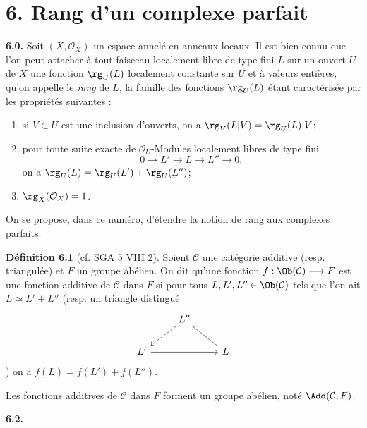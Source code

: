 \section*{6. Rang d'un complexe parfait}

\textbf{6.0.} Soit \((X,\mathcal O_X)\) un espace annelé en anneaux locaux. Il est bien connu que l'on peut attacher à tout faisceau localement libre de type fini \(L\) sur un ouvert \(U\) de \(X\) une fonction \(\rg_U(L)\) localement constante sur \(U\) et à valeurs entières, qu'on appelle le \emph{rang} de \(L\), la famille des fonctions \(\rg_U(L)\) étant caractérisée par les propriétés suivantes :
\begin{enumerate}[label=(\roman*)]
\item si \(V\subset U\) est une inclusion d'ouverts, on a \(\rg_V(L|V)=\rg_U(L)|V\);
\item pour toute suite exacte de \(\mathcal O_U\)-Modules localement libres de type fini
\[
  0\longrightarrow L'\longrightarrow L\longrightarrow L''\longrightarrow 0,
\]
on a \(\rg_U(L)=\rg_U(L')+\rg_U(L'')\);
\item \(\rg_X(\mathcal O_X)=1\).
\end{enumerate}
On se propose, dans ce numéro, d'étendre la notion de rang aux complexes parfaits.

\textbf{Définition 6.1} (cf. SGA 5 VIII 2). Soient \(\mathcal C\) une catégorie additive (resp. triangulée) et \(F\) un groupe abélien. On dit qu'une fonction \(f:\Ob(\mathcal C)\longrightarrow F\) est une fonction additive de \(\mathcal C\) dans \(F\) si pour tous \(L,L',L''\in\Ob(\mathcal C)\) tels que l'on ait \(L\simeq L'+L''\) (resp. un triangle distingué
\[
\begin{tikzcd}
& L'' \arrow[dl, dashed] & \\
L' \arrow[rr] && L \arrow[ul]
\end{tikzcd}
\]
) on a \(f(L)=f(L')+f(L'')\).

Les fonctions additives de \(\mathcal C\) dans \(F\) forment un groupe abélien, noté \(\Add(\mathcal C,F)\).

\textbf{6.2.}
